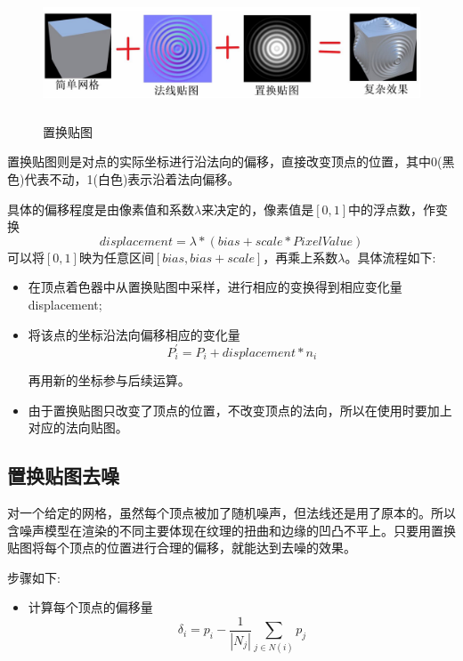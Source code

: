 \documentclass{article}
\begin{document}
		\begin{figure}[H]
		\begin{center}
			
			\includegraphics[width=17cm,height=4cm]{zhihuan}
			
			\caption{置换贴图}	\label{zhihuan.label}
		\end{center}
	\end{figure}
     置换贴图则是对点的实际坐标进行沿法向的偏移，直接改变顶点的位置，其中0(黑色)代表不动，1(白色)表示沿着法向偏移。
     
     具体的偏移程度是由像素值和系数$\lambda$来决定的，像素值是$[0,1]$中的浮点数，作变换
         $$ displacement = \lambda *(bias+scale*PixelValue) $$
      可以将$[0,1]$映为任意区间$[bias,bias+scale]$，再乘上系数$\lambda$。具体流程如下:
      \begin{itemize}
      	\item 在顶点着色器中从置换贴图中采样，进行相应的变换得到相应变化量displacement;
      \end{itemize}
     \begin{itemize}
  	\item 将该点的坐标沿法向偏移相应的变化量
  	    $$  P_i^{'}=P_i+displacement*n_i $$
  	    
  	    再用新的坐标参与后续运算。
    \end{itemize}

    \begin{itemize}
	\item 由于置换贴图只改变了顶点的位置，不改变顶点的法向，所以在使用时要加上对应的法向贴图。
    \end{itemize}

   
		\subsection{置换贴图去噪}
	 对一个给定的网格，虽然每个顶点被加了随机噪声，但法线还是用了原本的。所以含噪声模型在渲染的不同主要体现在纹理的扭曲和边缘的凹凸不平上。只要用置换贴图将每个顶点的位置进行合理的偏移，就能达到去噪的效果。
	 
	 步骤如下:
	   \begin{itemize}
	 	\item 计算每个顶点的偏移量
	 	    $$  \delta_i=p_i-\frac{1}{\left| N_j \right|}\sum_{j\in N(i)}p_j   $$
	 \end{itemize}
 
\end{document}
